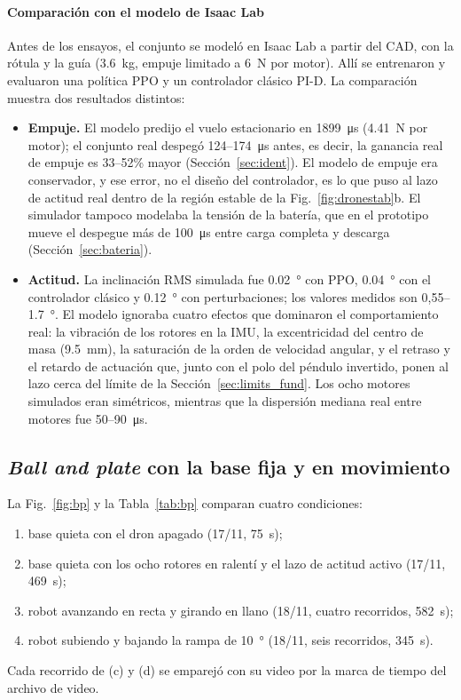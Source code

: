 \paragraph{Comparación con el modelo de Isaac Lab}
Antes de los ensayos, el conjunto se modeló en Isaac Lab \cite{mittal2023} a partir del CAD, con la rótula y la guía (\SI{3.6}{\kilo\gram}, empuje limitado a \SI{6}{\newton} por motor). Allí se entrenaron y evaluaron una política PPO \cite{schulman2017} y un controlador clásico PI-D. La comparación muestra dos resultados distintos:
\begin{itemize}
  \item \textbf{Empuje.} El modelo predijo el vuelo estacionario en \SI{1899}{\micro\second} (\SI{4.41}{\newton} por motor); el conjunto real despegó 124--\SI{174}{\micro\second} antes, es decir, la ganancia real de empuje es 33--52\% mayor (Sección~\ref{sec:ident}). El modelo de empuje era conservador, y ese error, no el diseño del controlador, es lo que puso al lazo de actitud real dentro de la región estable de la Fig.~\ref{fig:dronestab}b. El simulador tampoco modelaba la tensión de la batería, que en el prototipo mueve el despegue más de \SI{100}{\micro\second} entre carga completa y descarga (Sección~\ref{sec:bateria}).
  \item \textbf{Actitud.} La inclinación RMS simulada fue \SI{0.02}{\degree} con PPO, \SI{0.04}{\degree} con el controlador clásico y \SI{0.12}{\degree} con perturbaciones; los valores medidos son 0,55--\SI{1.7}{\degree}. El modelo ignoraba cuatro efectos que dominaron el comportamiento real: la vibración de los rotores en la IMU, la excentricidad del centro de masa (\SI{9.5}{\milli\metre}), la saturación de la orden de velocidad angular, y el retraso y el retardo de actuación que, junto con el polo del péndulo invertido, ponen al lazo cerca del límite de la Sección~\ref{sec:limits_fund}. Los ocho motores simulados eran simétricos, mientras que la dispersión mediana real entre motores fue 50--\SI{90}{\micro\second}.
\end{itemize}

\subsection{\textit{Ball and plate} con la base fija y en movimiento}
La Fig.~\ref{fig:bp} y la Tabla~\ref{tab:bp} comparan cuatro condiciones:
\begin{enumerate}[label=(\alph*)]
  \item base quieta con el dron apagado (17/11, \SI{75}{\second});
  \item base quieta con los ocho rotores en ralentí y el lazo de actitud activo (17/11, \SI{469}{\second});
  \item robot avanzando en recta y girando en llano (18/11, cuatro recorridos, \SI{582}{\second});
  \item robot subiendo y bajando la rampa de \SI{10}{\degree} (18/11, seis recorridos, \SI{345}{\second}).
\end{enumerate}
Cada recorrido de (c) y (d) se emparejó con su video por la marca de tiempo del archivo de video.

